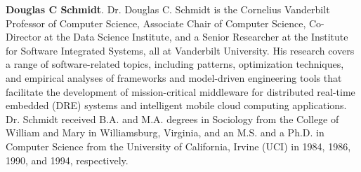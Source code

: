 \documentclass{river-journal}
\begin{document}

\medskip
\noindent
{\bf Douglas C Schmidt}. Dr. Douglas C. Schmidt is the Cornelius Vanderbilt Professor of Computer Science, Associate Chair of Computer Science, Co-Director at the Data Science Institute, and a Senior Researcher at the Institute for Software Integrated Systems, all at
Vanderbilt University. His research covers a range of software-related topics, including patterns, optimization techniques, and empirical analyses of frameworks and model-driven engineering tools that facilitate the development of mission-critical middleware for distributed real-time embedded (DRE) systems and intelligent mobile cloud computing applications. Dr. Schmidt received B.A. and M.A. degrees in Sociology from the College of William and Mary in Williamsburg, Virginia, and an M.S. and a Ph.D. in Computer Science from the University of California, Irvine (UCI) in 1984, 1986, 1990, and 1994, respectively.
\end{document}
